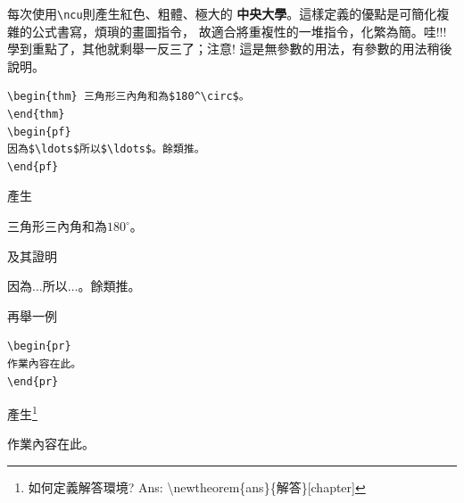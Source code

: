 \newcommand{\ncu}{{\color{red} \bf \Huge 中央大學}}
每次使用\verb|\ncu|則產生紅色、粗體、極大的\ncu。這樣定義的優點是可簡化複雜的公式書寫，煩瑣的畫圖指令， 故適合將重複性的一堆指令，化繁為簡。哇$!!!$學到重點了，其他就剩舉一反三了；注意$!$
這是無參數的用法，有參數的用法稍後說明。
\begin{Verbatim}[frame=single,firstline=1,label=Theorem]
\begin{thm} 三角形三內角和為$180^\circ$。
\end{thm}
\begin{pf}
因為$\ldots$所以$\ldots$。餘類推。
\end{pf} 
\end{Verbatim}
產生
\begin{thm} 三角形三內角和為$180^\circ$。  
\end{thm}
及其證明
\begin{pf}
因為$\ldots$所以$\ldots$。餘類推。
\end{pf} 
再舉一例
\begin{Verbatim}[frame=single,firstline=1,label=Problem]
\begin{pr}
作業內容在此。
\end{pr}
\end{Verbatim}
產生\footnote{如何定義解答環境? Ans: \textbackslash newtheorem\{ans\}\{解答\}[chapter]}
\begin{pr}
作業內容在此。
\end{pr}

